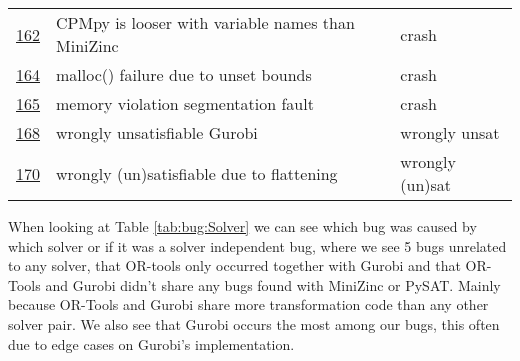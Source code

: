 \begin{table}[]
\begin{tabular}{lll}
		\href{https://github.com/CPMpy/cpmpy/issues/162}{162} & CPMpy is looser with variable names than MiniZinc & crash           \\
		\href{https://github.com/CPMpy/cpmpy/issues/164}{164} & malloc() failure due to unset bounds              & crash           \\
		\href{https://github.com/CPMpy/cpmpy/issues/165}{165} & memory violation segmentation fault               & crash           \\
		\href{https://github.com/CPMpy/cpmpy/issues/168}{168} & wrongly unsatisfiable Gurobi                      & wrongly unsat   \\
		\href{https://github.com/CPMpy/cpmpy/issues/170}{170} & wrongly (un)satisfiable due to flattening         & wrongly (un)sat \\ \bottomrule
	\end{tabular}
\end{table}

\label{res:SolverResponsible}
When looking at Table \ref{tab:bug:Solver} we can see which bug was caused by which solver or if it was a solver independent bug, where we see 5 bugs unrelated to any solver, that OR-tools only occurred together with Gurobi and that OR-Tools and Gurobi didn’t share any bugs found with MiniZinc or PySAT. Mainly because OR-Tools and Gurobi share more transformation code than any other solver pair. We also see that Gurobi occurs the most among our bugs, this often due to edge cases on Gurobi’s implementation. %

